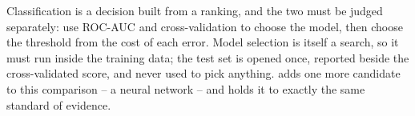 \begin{tcolorbox}[title=Chapter summary,colframe=orange,colback=white,arc=2mm]
Classification is a decision built from a ranking, and the two must be judged
separately: use ROC-AUC and cross-validation to choose the model, then choose
the threshold from the cost of each error. Model selection is itself a search,
so it must run inside the training data; the test set is opened once, reported
beside the cross-validated score, and never used to pick anything.
 adds one more candidate to this comparison -- a
neural network -- and holds it to exactly the same standard of evidence.
\end{tcolorbox}
